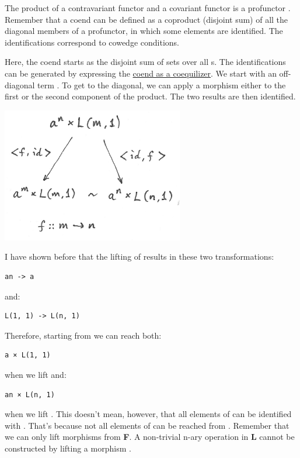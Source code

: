 The product of a contravariant functor  and a covariant
functor  is a profunctor
. Remember that a coend can be defined
as a coproduct (disjoint sum) of all the diagonal members of a
profunctor, in which some elements are identified. The identifications
correspond to cowedge conditions.

Here, the coend starts as the disjoint sum of sets
 over all s. The identifications can
be generated by expressing the
\href{https://bartoszmilewski.com/2017/03/29/ends-and-coends/}{coend as
a coequilizer}. We start with an off-diagonal term
. To get to the diagonal, we can apply a
morphism  either to the first or
the second component of the product. The two results are then
identified.

\includegraphics[width=3.12500in]{images/equalize1.png}

I have shown before that the lifting of
 results in these two
transformations:

\begin{verbatim}
an -> a
\end{verbatim}

and:

\begin{verbatim}
L(1, 1) -> L(n, 1)
\end{verbatim}

Therefore, starting from  we can reach both:

\begin{verbatim}
a × L(1, 1)
\end{verbatim}

when we lift  and:

\begin{verbatim}
an × L(n, 1)
\end{verbatim}

when we lift . This doesn't
mean, however, that all elements of  can be
identified with . That's because not all elements
of  can be reached from . Remember
that we can only lift morphisms from \textbf{F}. A non-trivial n-ary
operation in \textbf{L} cannot be constructed by lifting a morphism
.

